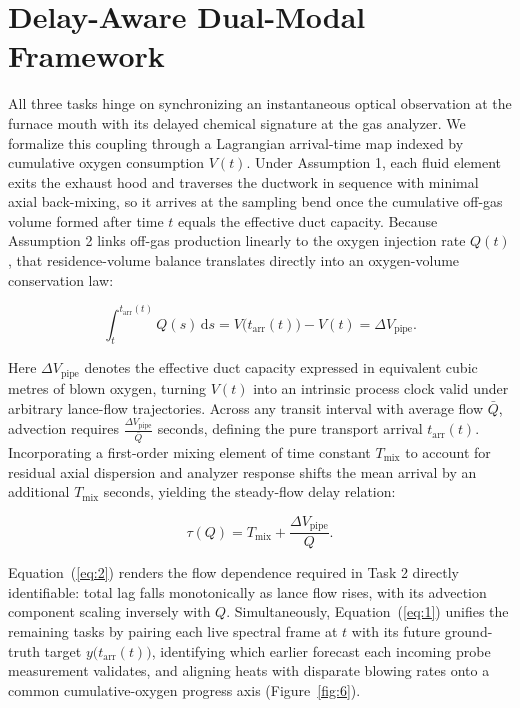 \FloatBarrier
\section{Delay-Aware Dual-Modal Framework}\label{sec:4}

All three tasks hinge on synchronizing an instantaneous optical observation at the furnace mouth with its delayed chemical signature at the gas analyzer. We formalize this coupling through a Lagrangian arrival-time map indexed by cumulative oxygen consumption $V(t)$. Under Assumption 1, each fluid element exits the exhaust hood and traverses the ductwork in sequence with minimal axial back-mixing, so it arrives at the sampling bend once the cumulative off-gas volume formed after time $t$ equals the effective duct capacity. Because Assumption 2 links off-gas production linearly to the oxygen injection rate $Q(t)$, that residence-volume balance translates directly into an oxygen-volume conservation law:

\begin{equation}
\int_{t}^{t_{\mathrm{arr}}(t)} Q(s)\,\mathrm{d}s = V\bigl(t_{\mathrm{arr}}(t)\bigr) - V(t) = \Delta V_{\mathrm{pipe}}. \label{eq:1}
\end{equation}

Here $\Delta V_{\mathrm{pipe}}$ denotes the effective duct capacity expressed in equivalent cubic metres of blown oxygen, turning $V(t)$ into an intrinsic process clock valid under arbitrary lance-flow trajectories. Across any transit interval with average flow $\bar{Q}$, advection requires $\frac{\Delta V_{\mathrm{pipe}}}{\bar{Q}}$ seconds, defining the pure transport arrival $t_{\mathrm{arr}}(t)$. Incorporating a first-order mixing element of time constant $T_{\mathrm{mix}}$ to account for residual axial dispersion and analyzer response shifts the mean arrival by an additional $T_{\mathrm{mix}}$ seconds, yielding the steady-flow delay relation:

\begin{equation}
\tau(Q) = T_{\mathrm{mix}} + \frac{\Delta V_{\mathrm{pipe}}}{Q}. \label{eq:2}
\end{equation}

Equation~(\ref{eq:2}) renders the flow dependence required in Task 2 directly identifiable: total lag falls monotonically as lance flow rises, with its advection component scaling inversely with $Q$. Simultaneously, Equation~(\ref{eq:1}) unifies the remaining tasks by pairing each live spectral frame at $t$ with its future ground-truth target $y\bigl(t_{\mathrm{arr}}(t)\bigr)$, identifying which earlier forecast each incoming probe measurement validates, and aligning heats with disparate blowing rates onto a common cumulative-oxygen progress axis (Figure~\ref{fig:6}).

